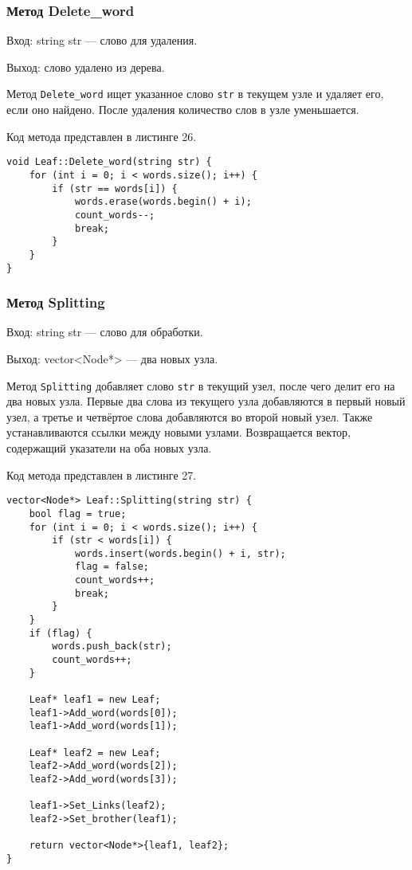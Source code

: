 \documentclass[10pt,a4paper,final]{article} %
\begin{document}
\subsubsection{Метод Delete\_word} 
Вход: string str — слово для удаления. \par 
Выход: слово удалено из дерева. \par 
\par Метод \texttt{Delete\_word} ищет указанное слово \texttt{str} в текущем узле и удаляет его, если оно найдено. После удаления количество слов в узле уменьшается.

Код метода представлен в листинге 26. \begin{lstlisting}[label=deleteWordMethod, caption = Метод Delete\_word] 
void Leaf::Delete_word(string str) {
	for (int i = 0; i < words.size(); i++) {
		if (str == words[i]) {
			words.erase(words.begin() + i);
			count_words--;
			break;
		}
	}
}\end{lstlisting}




\subsubsection{Метод Splitting} 
Вход: string str — слово для обработки. \par
Выход: vector<Node*> — два новых узла. \par
\par Метод \texttt{Splitting} добавляет слово \texttt{str} в текущий узел, после чего делит его на два новых узла. Первые два слова из текущего узла добавляются в первый новый узел, а третье и четвёртое слова добавляются во второй новый узел. Также устанавливаются ссылки между новыми узлами. Возвращается вектор, содержащий указатели на оба новых узла.

Код метода представлен в листинге 27. \begin{lstlisting}[label=splittingLeafMethod, caption = Метод Splitting для класса Leaf] 
vector<Node*> Leaf::Splitting(string str) {
	bool flag = true;
	for (int i = 0; i < words.size(); i++) {
		if (str < words[i]) {
			words.insert(words.begin() + i, str);
			flag = false;
			count_words++;
			break;
		}
	}
	if (flag) {
		words.push_back(str);
		count_words++;
	}
	
	Leaf* leaf1 = new Leaf;
	leaf1->Add_word(words[0]);
	leaf1->Add_word(words[1]);
	
	Leaf* leaf2 = new Leaf;
	leaf2->Add_word(words[2]);
	leaf2->Add_word(words[3]);
	
	leaf1->Set_Links(leaf2);
	leaf2->Set_brother(leaf1);
	
	return vector<Node*>{leaf1, leaf2};
}\end{lstlisting}
\end{document}
